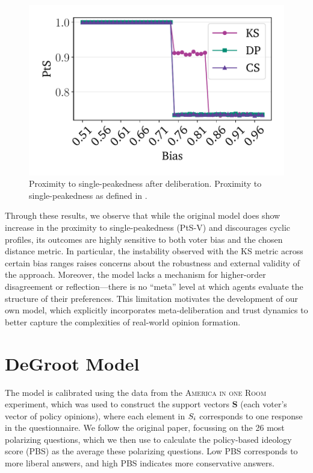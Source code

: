 \begin{figure}[htbp]
	\begin{minipage}{0.45\textwidth}
		\centering
		\vspace{-9pt}
		\includegraphics[width=\textwidth]{Figures/sp_proximity_PtS.pdf}
		\caption{Proximity to single-peakedness after deliberation. Proximity to single-peakedness as defined in .}
		\label{fig:rep_single_peaked}
	\end{minipage}
\end{figure}

Through these results, we observe that while the original model does show
increase in the proximity to single-peakedness (PtS-V) and discourages cyclic
profiles, its outcomes are highly sensitive to both voter bias and the chosen
distance metric. In particular, the instability observed with the KS metric
across certain bias ranges raises concerns about the robustness and external
validity of the approach. Moreover, the model lacks a mechanism for
higher-order disagreement or reflection—there is no ``meta'' level at which
agents evaluate the structure of their preferences. This limitation motivates
the development of our own model, which explicitly incorporates
meta-deliberation and trust dynamics to better capture the complexities of
real-world opinion formation.

\newpage
\section{DeGroot Model}\label{degroot_results}

The model is calibrated using the data from the \textsc{America in one Room}
experiment, which was used to construct the support vectors $\boldsymbol{S}$ (each
voter's vector of policy opinions), where each element in $S_i$
corresponds to one response in the questionnaire. We follow the original paper,
focussing on the 26 most polarizing questions, which we then use to calculate
the policy-based ideology score (PBS) as the average these polarizing
questions. Low PBS corresponds to more liberal answers, and high PBS indicates
more conservative answers.

